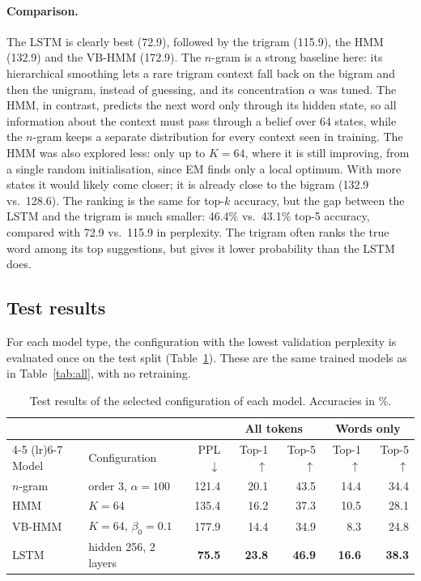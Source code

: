 \documentclass[11pt]{article}
\begin{document}
\paragraph{Comparison.} The LSTM is clearly best (72.9), followed by the trigram (115.9), the HMM (132.9) and the VB-HMM (172.9). The $n$-gram is a strong baseline here: its hierarchical smoothing lets a rare trigram
context fall back on the bigram and then the unigram, instead of
guessing, and its concentration $\alpha$ was tuned. The HMM, in
contrast, predicts the next word only through its hidden state, so all
information about the context must pass through a belief over 64
states, while the $n$-gram keeps a separate distribution for every
context seen in training. The HMM was also explored less: only up to
$K = 64$, where it is still improving, from a single random
initialisation, since EM finds only a local optimum. With more states
it would likely come closer; it is already close to the bigram
(132.9 vs.\ 128.6). 
The ranking is the same for top-$k$ accuracy, but
the gap between the LSTM and the trigram is much smaller: 46.4\% vs.\
43.1\% top-5 accuracy, compared with 72.9 vs.\ 115.9 in perplexity. The
trigram often ranks the true word among its top suggestions, but gives
it lower probability than the LSTM does.



\subsection{Test results}
\label{sec:test}

For each model type, the configuration with the lowest validation perplexity
is evaluated once on the test split (Table~\ref{tab:test}). These are the
same trained models as in Table~\ref{tab:all}, with no retraining.

\begin{table}[h]
\centering
\small
\begin{tabular}{ll r rr rr}
\toprule
 & & & \multicolumn{2}{c}{All tokens} & \multicolumn{2}{c}{Words only} \\
\cmidrule(lr){4-5} \cmidrule(lr){6-7}
Model & Configuration & PPL $\downarrow$& Top-1 $\uparrow$& Top-5 $\uparrow$& Top-1$\uparrow$ & Top-5 $\uparrow$\\
\midrule
$n$-gram & order 3, $\alpha = 100$     & 121.4 & 20.1 & 43.5 & 14.4 & 34.4 \\
HMM      & $K = 64$                    & 135.4 & 16.2 & 37.3 & 10.5 & 28.1 \\
VB-HMM   & $K = 64$, $\beta_0 = 0.1$   & 177.9 & 14.4 & 34.9 & 8.3  & 24.8 \\
LSTM     & hidden 256, 2 layers         & \textbf{75.5} & \textbf{23.8} & \textbf{46.9} & \textbf{16.6} & \textbf{38.3} \\
\bottomrule
\end{tabular}
\caption{Test results of the selected configuration of each model.
Accuracies in \%.}
\label{tab:test}
\end{table}
\end{document}
